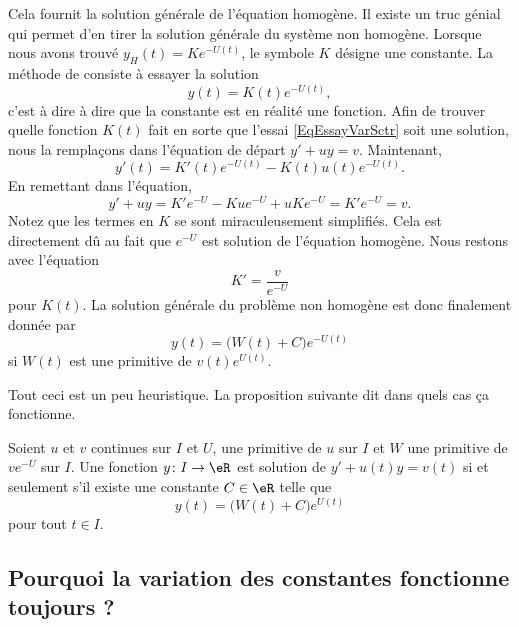 Cela fournit la solution générale de l'équation homogène. Il existe un truc génial qui permet d'en tirer la solution générale du système non homogène. Lorsque nous avons trouvé $y_H(t)=K e^{-U(t)}$, le symbole $K$ désigne une constante. La méthode de  consiste à essayer la solution
\begin{equation}		\label{EqEssayVarSctr}
	y(t)=K(t) e^{-U(t)},
\end{equation}
c'est à dire à dire que la constante est en réalité une fonction. Afin de trouver quelle fonction $K(t)$ fait en sorte que l'essai \eqref{EqEssayVarSctr} soit une solution, nous la remplaçons dans l'équation de départ $y'+uy=v$. Maintenant,
\begin{equation}
	y'(t)=K'(t) e^{-U(t)}-K(t)u(t) e^{-U(t)}.
\end{equation}
En remettant dans l'équation,
\begin{equation}
	y'+uy=K' e^{-U}-Ku e^{-U}+uK e^{-U}=K' e^{-U}=v.
\end{equation}
Notez que les termes en $K$ se sont miraculeusement simplifiés. Cela est directement dû au fait que $ e^{-U}$ est solution de l'équation homogène. Nous restons avec l'équation
\begin{equation}
	K'=\frac{ v }{  e^{-U} }
\end{equation}
pour $K(t)$. La solution générale du problème non homogène est donc finalement donnée par
\begin{equation}
	y(t)=\big( W(t)+C \big) e^{-U(t)}
\end{equation}
si $W(t)$ est une primitive de $v(t)e^{U(t)}$.

Tout ceci est un peu heuristique. La proposition suivante dit dans quels cas ça fonctionne.
\begin{proposition}
Soient $u$ et $v$ continues sur $I$ et $U$, une primitive de $u$ sur $I$ et $W$ une primitive de $v e^{-U}$ sur $I$. Une fonction $y\colon I\to \eR$ est solution de $y'+u(t)y=v(t)$ si et seulement s'il existe une constante $C\in \eR$ telle que
\begin{equation}
	y(t)=\big( W(t)+C \big) e^{U(t)}
\end{equation}
pour tout $t\in I$.
\end{proposition}

\subsection{Pourquoi la variation des constantes fonctionne toujours ?}


